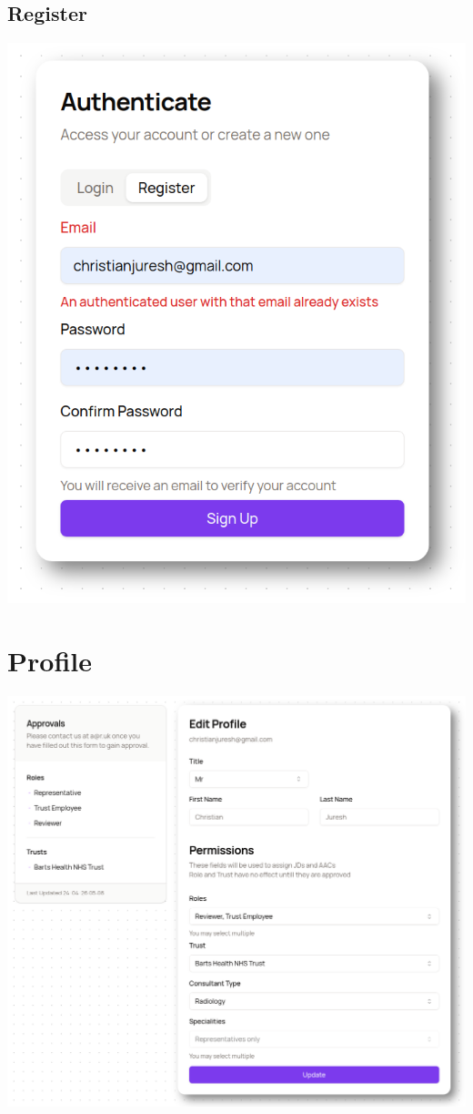 \begin{appendices}
{\subsection{Register}
\includegraphics[width=0.35\textheight]{images/register.png}

\section{Profile} \label{app:Profile}
\includegraphics[width=\textwidth]{images/profile.png}

}
\end{appendices}
